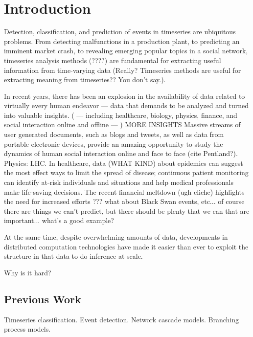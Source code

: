 \chapter{Introduction}
Detection, classification, and prediction of events in timeseries are ubiquitous problems. From detecting malfunctions in a production plant, to predicting an imminent market crash, to revealing emerging popular topics in a social network, timeseries analysis methods (????) are fundamental for extracting useful information from time-varying data (Really? Timeseries methods are useful for extracting meaning from timeseries?? You don't say.).

In recent years, there has been an explosion in the availability of data related to virtually every human endeavor --- data that demands to be analyzed and turned into valuable insights. ( --- including healthcare, biology, physics, finance, and social interaction online and offline --- ) MORE INSIGHTS Massive streams of user generated documents, such as blogs and tweets, as well as data from portable electronic devices, provide an amazing opportunity to study the dynamics of human social interaction online and face to face (cite Pentland?). Physics: LHC. In healthcare, data (WHAT KIND) about epidemics can suggest the most effect ways to limit the spread of disease; continuous patient monitoring can identify at-risk individuals and situations and help medical professionals make life-saving decisions. The recent financial meltdown (ugh cliche) highlights the need for increased efforts ??? what about Black Swan events, etc... of course there are things we can't predict, but there should be plenty that we can that are important... what's a good example?

At the same time, despite overwhelming amounts of data, developments in distributed computation technologies have made it easier than ever to exploit the structure in that data to do inference at scale.

Why is it hard?

\section{Previous Work}
Timeseries classification. Event detection. Network cascade models. Branching process models.

